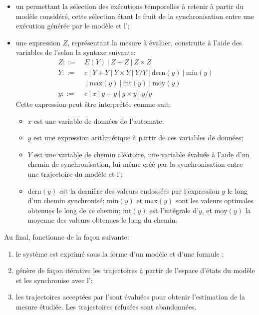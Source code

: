 \begin{itemize}
    \item un \alh permettant la sélection des exécutions temporelles à retenir à partir du modèle \rpsg considéré, cette sélection étant le fruit de la synchronisation entre une exécution générée par le modèle \rpsg et l'\alh;
    \item une expression $Z$, représentant la mesure à évaluer, construite à l'aide des variables de l'\alh selon la syntaxe suivante:
    \[
        \begin{split}
            Z ::=  & \ E(Y)\ | \ Z+Z\           | \ Z \times Z\\
            Y ::=  & \ c\    | \ Y+Y\           | \ Y \times Y\    | \ Y/Y\            | \ \mbox{dern}(y)\ | \ \mbox{min}(y)\\
                   & \ \     | \ \mbox{max}(y)\ | \ \mbox{int}(y)\ | \ \mbox{moy}(y)\\
            y ::=  & \ c\    | \ x\             | \ y+y\           | \ y \times y\     | \ y/y
        \end{split}
    \]
    Cette expression peut être interprétée comme suit:
    \begin{itemize}
        \item $x$ est une variable de données de l'automate:
        \item $y$ est une expression arithmétique à partir de ces variables de données;
        \item $Y$ est une variable de chemin aléatoire, \cad une variable évaluée à l'aide d'un chemin de synchronisation, lui-même créé par la synchronisation entre une trajectoire du modèle \rpsg et l'\alh;
        \item $\mbox{dern}(y)$ est la dernière des valeurs endossées par l'expression $y$ le long d'un chemin synchronisé; $\mbox{min}(y)$ et $\mbox{max}(y)$ sont les valeurs optimales obtenues le long de ce chemin; $\mbox{int}(y)$ est l'intégrale d'$y$, et $\mbox{moy}(y)$ la moyenne des valeurs obtenues le long du chemin.
    \end{itemize}
\end{itemize}

Au final, \lsah fonctionne de la façon suivante:
\begin{enumerate}
    \item le système est exprimé sous la forme d'un modèle \rpsg et d'une formule \lsah;
    \item \lsah génère de façon itérative les trajectoires à partir de l'espace d'états du modèle \rpsg et les synchronise avec l'\alh;
    \item les trajectoires acceptées par l'\alh sont évaluées pour obtenir l'estimation de la mesure étudiée. Les trajectoires refusées sont abandonnées.
\end{enumerate}

